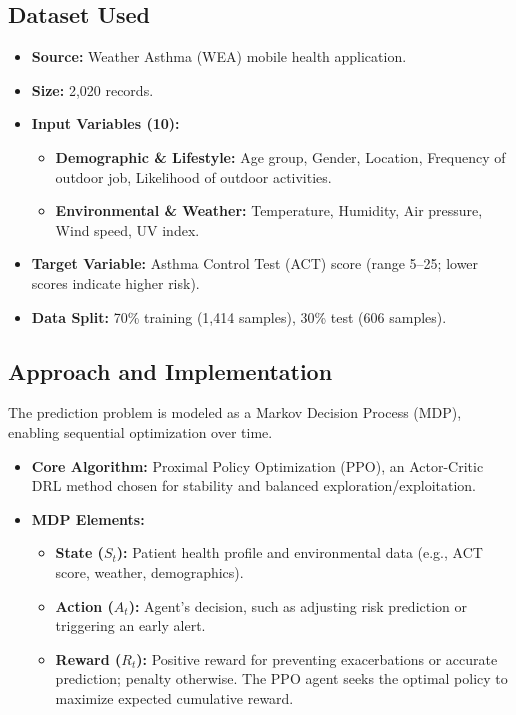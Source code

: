 \subsection*{Dataset Used}
\begin{itemize}
    \item \textbf{Source:} Weather Asthma (WEA) mobile health application.
    \item \textbf{Size:} 2,020 records.
    \item \textbf{Input Variables (10):}
    \begin{itemize}
        \item \textbf{Demographic \& Lifestyle:} Age group, Gender, Location, Frequency of outdoor job, Likelihood of outdoor activities.
        \item \textbf{Environmental \& Weather:} Temperature, Humidity, Air pressure, Wind speed, UV index.
    \end{itemize}
    \item \textbf{Target Variable:} Asthma Control Test (ACT) score (range 5--25; lower scores indicate higher risk).
    \item \textbf{Data Split:} 70\% training (1,414 samples), 30\% test (606 samples).
\end{itemize}

\subsection*{Approach and Implementation}
The prediction problem is modeled as a Markov Decision Process (MDP), enabling sequential optimization over time.

\begin{itemize}
    \item \textbf{Core Algorithm:} Proximal Policy Optimization (PPO), an Actor-Critic DRL method chosen for stability and balanced exploration/exploitation.
    \item \textbf{MDP Elements:}
    \begin{itemize}
        \item \textbf{State ($S_t$):} Patient health profile and environmental data (e.g., ACT score, weather, demographics).
        \item \textbf{Action ($A_t$):} Agent's decision, such as adjusting risk prediction or triggering an early alert.
        \item \textbf{Reward ($R_t$):} Positive reward for preventing exacerbations or accurate prediction; penalty otherwise. The PPO agent seeks the optimal policy to maximize expected cumulative reward.
    \end{itemize}
\end{itemize}

